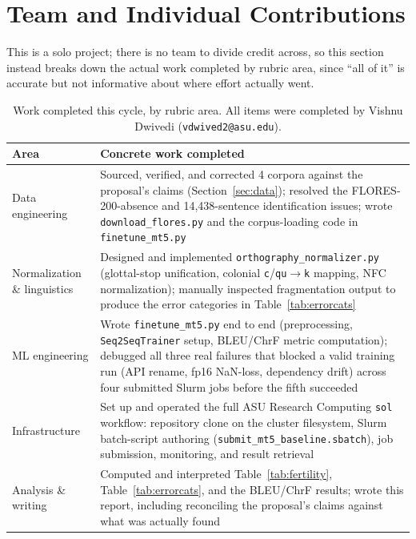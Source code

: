 \documentclass[11pt]{article}
\begin{document}
\section{Team and Individual Contributions}
\label{sec:contributions}

This is a solo project; there is no team to divide credit across, so this
section instead breaks down the actual work completed by rubric area, since
``all of it'' is accurate but not informative about where effort actually
went.

\begin{table}[h]
\centering
\small
\setlength{\tabcolsep}{3pt}
\begin{tabular}{p{2.3cm}p{4.9cm}}
\toprule
\textbf{Area} & \textbf{Concrete work completed} \\
\midrule
Data engineering & Sourced, verified, and corrected 4 corpora against the
  proposal's claims (Section~\ref{sec:data}); resolved the
  FLORES-200-absence and 14,438-sentence identification issues; wrote
  \texttt{download\_flores.py} and the corpus-loading code in
  \texttt{finetune\_mt5.py} \\
Normalization \& linguistics & Designed and implemented
  \texttt{orthography\_normalizer.py} (glottal-stop unification, colonial
  \texttt{c}/\texttt{qu}$\to$\texttt{k} mapping, NFC normalization); manually
  inspected fragmentation output to produce the error categories in
  Table~\ref{tab:errorcats} \\
ML engineering & Wrote \texttt{finetune\_mt5.py} end to end
  (preprocessing, \texttt{Seq2SeqTrainer} setup, BLEU/ChrF metric
  computation); debugged all three real failures that blocked a valid
  training run (API rename, fp16 NaN-loss, dependency drift) across four
  submitted Slurm jobs before the fifth succeeded \\
Infrastructure & Set up and operated the full ASU Research Computing
  \texttt{sol} workflow: repository clone on the cluster filesystem, Slurm
  batch-script authoring (\texttt{submit\_mt5\_baseline.sbatch}), job
  submission, monitoring, and result retrieval \\
Analysis \& writing & Computed and interpreted Table~\ref{tab:fertility},
  Table~\ref{tab:errorcats}, and the BLEU/ChrF results; wrote this report,
  including reconciling the proposal's claims against what was actually
  found \\
\bottomrule
\end{tabular}
\caption{Work completed this cycle, by rubric area. All items were completed
by Vishnu Dwivedi (\texttt{vdwived2@asu.edu}).}
\label{tab:contributions}
\end{table}
\end{document}
